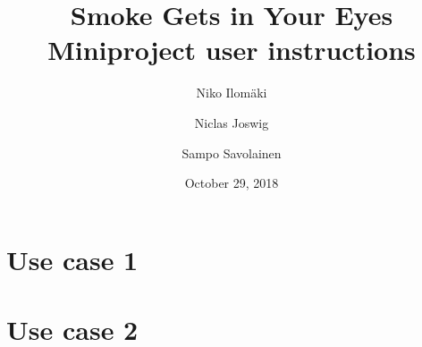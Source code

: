 \documentclass[a4paper,12pt]{article}
\title{Smoke Gets in Your Eyes\\\Large{Miniproject user instructions}}
\author{Niko Ilomäki \and Niclas Joswig \and Sampo Savolainen}
\date{October 29, 2018}
\begin{document}
\maketitle

\section{Use case 1}


\section{Use case 2}
\end{document}
